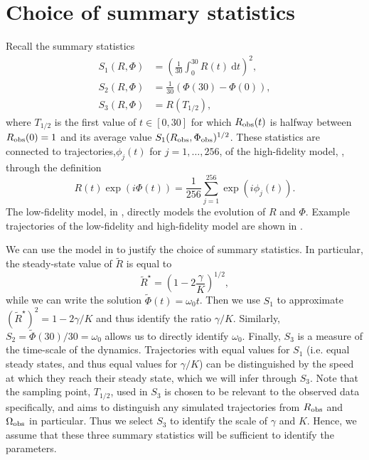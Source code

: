 \documentclass[demo,supplement,review]{siamonline190516}
\begin{document}
\maketitle

\section{Choice of summary statistics}
\label{appendix:summary_statistics}

Recall the summary statistics
\begin{align*}
S_1(R, \Phi) &= \left( \frac{1}{30} \int_0^{30} R(t) ~\mathrm dt \right)^2, \\
S_2(R, \Phi) &= \frac{1}{30} \left( \Phi(30) - \Phi(0) \right), \\
S_3(R, \Phi) &= R \left( T_{1/2} \right),
\end{align*}
where $T_{1/2}$ is the first value of $t \in [0,30]$ for which $R_{\mathrm{obs}}(t)$ is halfway between $R_{\mathrm{obs}}(0)=1$ and its average value $S_1(R_{\mathrm{obs}}, \Phi_{\mathrm{obs}})^{1/2}$.
These statistics are connected to trajectories,$\phi_j(t)$ for $j =1,\dots,256$, of the high-fidelity model, , through the definition
\[
R(t) \exp (i \Phi(t)) = \frac{1}{256} \sum_{j=1}^{256} \exp(i \phi_j(t)).
\]
The low-fidelity model, in , directly models the evolution of $R$ and $\Phi$.
Example trajectories of the low-fidelity and high-fidelity model are shown in .

We can use the model in  to justify the choice of summary statistics.
In particular, the steady-state value of $\tilde R$ is equal to
\[
\tilde R^\star = \left( 1 - 2\frac{\gamma}{K} \right)^{1/2},
\]
while we can write the solution $\tilde \Phi(t) = \omega_0 t$.
Then we use $S_1$ to approximate $(\tilde R^\star)^2 = 1 - 2\gamma/K$ and thus identify the ratio $\gamma/K$.
Similarly, $S_2 = \tilde \Phi(30)/30 = \omega_0$ allows us to directly identify $\omega_0$.
Finally, $S_3$ is a measure of the time-scale of the dynamics.
Trajectories with equal values for $S_1$ (i.e. equal steady states, and thus equal values for $\gamma/K$) can be distinguished by the speed at which they reach their steady state, which we will infer through $S_3$.
Note that the sampling point, $T_{1/2}$, used in $S_3$ is chosen to be relevant to the observed data specifically, and aims to distinguish any simulated trajectories from $R_{\mathrm{obs}}$ and $\Omega_{\mathrm{obs}}$ in particular.
Thus we select $S_3$ to identify the scale of $\gamma$ and $K$.
Hence, we assume that these three summary statistics will be sufficient to identify the parameters.
\end{document}
